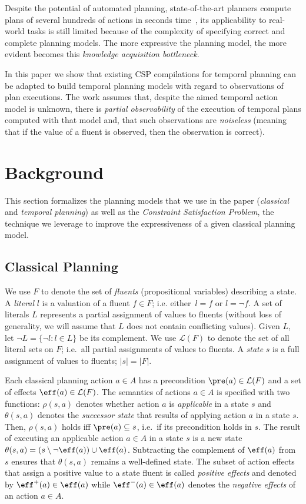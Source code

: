 \documentclass[runningheads]{llncs}
\begin{document}
Despite the potential of automated planning, state-of-the-art planners compute plans of several hundreds of actions in seconds time~\cite{vallati20152014}, its applicability to real-world tasks is still limited because of the complexity of specifying correct and complete planning models. The more expressive the planning model, the more evident becomes this {\em knowledge acquisition bottleneck}.

In this paper we show that existing CSP compilations for temporal planning can be adapted to build temporal planning models with regard to observations of plan executions. The work assumes that, despite the aimed temporal action model is unknown, there is {\em partial observability} of the execution of temporal plans computed with that model and, that such observations are {\em noiseless} (meaning that if the value of a fluent is observed, then the observation is correct).



\section{Background}
\label{sec:background}
This section formalizes the planning models that we use in the paper ({\em classical} and {\em temporal planning}) as well as the {\em Constraint Satisfaction Problem}, the technique we leverage to improve the expressiveness of a given classical planning model.

\subsection{Classical Planning}
We use $F$ to denote the set of {\em fluents} (propositional variables) describing a state. A {\em literal} $l$ is a valuation of a fluent $f\in F$; i.e. either~$l=f$ or $l=\neg f$. A set of literals $L$ represents a partial assignment of values to fluents (without loss of generality, we will assume that $L$ does not contain conflicting values). Given $L$, let $\neg L=\{\neg l:l\in L\}$ be its complement. We use $\mathcal{L}(F)$ to denote the set of all literal sets on $F$; i.e.~all partial assignments of values to fluents. A {\em state} $s$ is a full assignment of values to fluents; $|s|=|F|$.

Each classical planning action $a\in A$ has a precondition $\pre(a)\in\mathcal{L}(F)$ and a set of effects $\eff(a)\in\mathcal{L}(F)$. The semantics of actions $a\in A$ is specified with two functions: $\rho(s,a)$ denotes whether action $a$ is {\em applicable} in a state $s$ and $\theta(s,a)$ denotes the {\em successor state} that results of applying action $a$ in a state $s$. Then, $\rho(s,a)$ holds iff $\pre(a)\subseteq s$, i.e.~if its precondition holds in $s$. The result of executing an applicable action $a\in A$ in a state $s$ is a new state $\theta(s,a)=(s\setminus \neg\eff(a))\cup\eff(a)$. Subtracting the complement of $\eff(a)$ from $s$ ensures that $\theta(s,a)$ remains a well-defined state. The subset of action effects that assign a positive value to a state fluent is called {\em positive effects} and denoted by $\eff^+(a)\in \eff(a)$ while $\eff^-(a)\in \eff(a)$ denotes the {\em negative effects} of an action $a\in A$.
\end{document}
